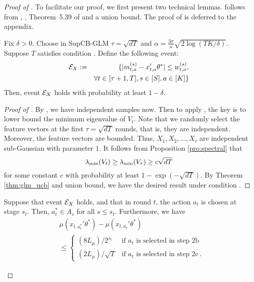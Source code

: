 \begin{proof}[Proof of ]
To facilitate our proof, we first present two technical lemmas.   follows from  , ,  Theorem~5.39 of \citet{vershynin2010introduction} and a union bound.  The proof of  is deferred to the appendix.

\begin{lemma} \label{lm:ucb}
Fix $\delta>0$. Choose in SupCB-GLM $\tau=\sqrt{dT}$ and $\alpha=\frac{3\sigma}{\kappa} \sqrt{2\log(TK/\delta)}$.  Suppose $T$ satisfies condition .  Define the following event:
\begin{eqnarray}
\mathcal{E}_X &:=& \{|m_{t,a}^{(s)} - x_{t,a}'\theta^*| \le w_{t,a}^{(s)}, 
\label{eq:ucb} \\
&& \forall t\in[\tau+1,T], s\in[S], a\in[K]\} \nonumber
\end{eqnarray}
Then, event $\mathcal{E}_X$ holds with probability at least $1-\delta $.
\end{lemma}

\begin{proof} [Proof of ]
By , we have independent samples now. Then to apply , the key is to lower bound the minimum eigenvalue of $V_t$. Note that we randomly select the feature vectors at the first $\tau=\sqrt{dT}$ rounds, that is, they are independent. Moreover, the feature vectors are bounded. Thus, $X_1, X_2, \ldots, X_\tau$ are independent sub-Gaussian with parameter $1$.  It follows from Proposition \ref{pro:spectral} that
\[
\lambda_{\min}(V_t) \ge \lambda_{\min}(V_\tau) \ge c\sqrt{dT}
\]
for some constant $c$ with probability at least $1-\exp(-\sqrt{dT})$. By Theorem \ref{thm:glm_ucb} and union bound, we have the desired result under condition  .
\end{proof}

\begin{lemma} \label{lm:propSup}
Suppose that event $\mathcal{E}_X$ holds, and that in round $t$, the action $a_t$ is chosen at stage $s_t$.  Then, $a_t^{*} \in A_s$ for all $s \le s_t$. Furthermore, we have
\begin{align*}
&\mu(x_{t,a_t^*}' \theta^*) - \mu(x_{t,a_t}' \theta^*) \\
&\le \left\{ \begin{array}{ll}
 (8 L_\mu)/2^{s_t} & \textrm{if $a_t$ is selected in step 2b}\\
 (2L_\mu)/\sqrt{T} & \textrm{if $a_t$ is selected in step 2c}\,.
  \end{array} \right.
\end{align*}
\end{lemma}


\end{proof}
